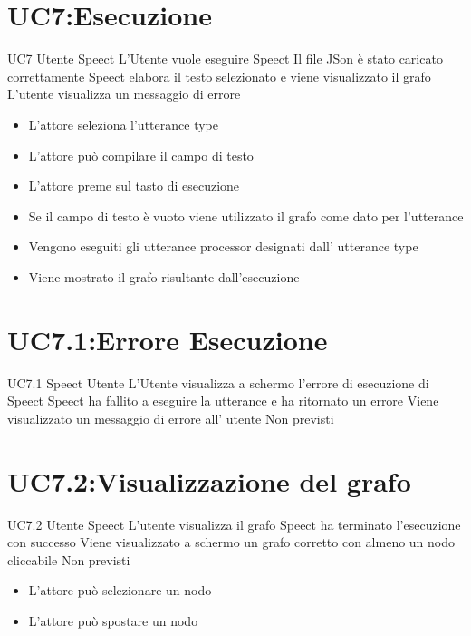 \documentclass[../AnalisideiRequisiti.tex]{subfiles}
\begin{document}
\section{UC7:Esecuzione}
\UserCase
{UC7}
{Utente}
{Speect}
{L'Utente vuole eseguire Speect}
{Il file JSon è stato caricato correttamente}
{Speect elabora il testo selezionato e viene visualizzato il grafo}
{L'utente visualizza un messaggio di errore }
{\begin{itemize}
		\item{} L'attore seleziona l'utterance type
		\item{} L'attore può compilare il campo di testo
		\item{} L'attore preme sul tasto di esecuzione
		\item{} Se il campo di testo è vuoto viene utilizzato il grafo come dato per l'utterance
		\item{} Vengono eseguiti gli utterance processor designati dall' utterance type
		\item{} Viene mostrato il grafo risultante dall'esecuzione
	\end{itemize}
}

\section{UC7.1:Errore Esecuzione}
\UserCase
{UC7.1}
{Speect}
{Utente}
{L'Utente visualizza a schermo l'errore di esecuzione di Speect }
{Speect ha fallito a eseguire la utterance e ha ritornato un errore}
{Viene visualizzato un messaggio di errore all' utente}
{Non previsti}
{}
\section{UC7.2:Visualizzazione del grafo}
\UserCase
{UC7.2}
{Utente}
{Speect}
{L'utente visualizza il grafo}
{Speect ha terminato l'esecuzione con successo}
{Viene visualizzato a schermo un grafo corretto con almeno un nodo cliccabile}
{Non previsti}
{
	\begin{itemize}
		\item{} L'attore può selezionare un nodo 
		\item{} L'attore può spostare un nodo 
	\end{itemize}
}
\end{document}
